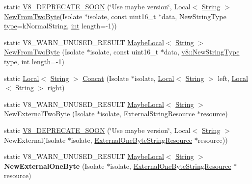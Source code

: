 \begin{DoxyCompactItemize}
\item 
static \mbox{\hyperlink{classv8_1_1String_aeab948105979e2ffd61eb552b0da4e50}{V8\+\_\+\+D\+E\+P\+R\+E\+C\+A\+T\+E\+\_\+\+S\+O\+ON}} (\char`\"{}Use maybe version\char`\"{}, Local$<$ \mbox{\hyperlink{classv8_1_1String}{String}} $>$ \mbox{\hyperlink{classv8_1_1String_a6b3efe5df1016e4f9f485e79b0acdf5b}{New\+From\+Two\+Byte}}(Isolate $\ast$isolate, const uint16\+\_\+t $\ast$data, New\+String\+Type \mbox{\hyperlink{classstd_1_1conditional_1_1type}{type}}=k\+Normal\+String, \mbox{\hyperlink{classint}{int}} length=-\/1))
\item 
static V8\+\_\+\+W\+A\+R\+N\+\_\+\+U\+N\+U\+S\+E\+D\+\_\+\+R\+E\+S\+U\+LT \mbox{\hyperlink{classv8_1_1MaybeLocal}{Maybe\+Local}}$<$ \mbox{\hyperlink{classv8_1_1String}{String}} $>$ \mbox{\hyperlink{classv8_1_1String_a6b3efe5df1016e4f9f485e79b0acdf5b}{New\+From\+Two\+Byte}} (Isolate $\ast$isolate, const uint16\+\_\+t $\ast$data, \mbox{\hyperlink{namespacev8_ac9163ab12fb3b2a95907a3a0367c6095}{v8\+::\+New\+String\+Type}} \mbox{\hyperlink{classstd_1_1conditional_1_1type}{type}}, \mbox{\hyperlink{classint}{int}} length=-\/1)
\item 
static \mbox{\hyperlink{classv8_1_1Local}{Local}}$<$ \mbox{\hyperlink{classv8_1_1String}{String}} $>$ \mbox{\hyperlink{classv8_1_1String_a7ca729608359a02c17631fcc8ae7b8d7}{Concat}} (Isolate $\ast$isolate, \mbox{\hyperlink{classv8_1_1Local}{Local}}$<$ \mbox{\hyperlink{classv8_1_1String}{String}} $>$ left, \mbox{\hyperlink{classv8_1_1Local}{Local}}$<$ \mbox{\hyperlink{classv8_1_1String}{String}} $>$ right)
\item 
static V8\+\_\+\+W\+A\+R\+N\+\_\+\+U\+N\+U\+S\+E\+D\+\_\+\+R\+E\+S\+U\+LT \mbox{\hyperlink{classv8_1_1MaybeLocal}{Maybe\+Local}}$<$ \mbox{\hyperlink{classv8_1_1String}{String}} $>$ \mbox{\hyperlink{classv8_1_1String_a31979e3688dfeab2f74b90a1bec50f9b}{New\+External\+Two\+Byte}} (Isolate $\ast$isolate, \mbox{\hyperlink{classv8_1_1String_1_1ExternalStringResource}{External\+String\+Resource}} $\ast$resource)
\item 
static \mbox{\hyperlink{classv8_1_1String_ad7186b5cfdddffbee8235a7216f31a67}{V8\+\_\+\+D\+E\+P\+R\+E\+C\+A\+T\+E\+\_\+\+S\+O\+ON}} (\char`\"{}Use maybe version\char`\"{}, Local$<$ \mbox{\hyperlink{classv8_1_1String}{String}} $>$ New\+External(Isolate $\ast$isolate, \mbox{\hyperlink{classv8_1_1String_1_1ExternalOneByteStringResource}{External\+One\+Byte\+String\+Resource}} $\ast$resource))
\item 
\mbox{\label{classv8_1_1String_a7f104356e56751f0a0223e28786cd801}} 
static V8\+\_\+\+W\+A\+R\+N\+\_\+\+U\+N\+U\+S\+E\+D\+\_\+\+R\+E\+S\+U\+LT \mbox{\hyperlink{classv8_1_1MaybeLocal}{Maybe\+Local}}$<$ \mbox{\hyperlink{classv8_1_1String}{String}} $>$ {\bfseries New\+External\+One\+Byte} (Isolate $\ast$isolate, \mbox{\hyperlink{classv8_1_1String_1_1ExternalOneByteStringResource}{External\+One\+Byte\+String\+Resource}} $\ast$resource)
\end{DoxyCompactItemize}

